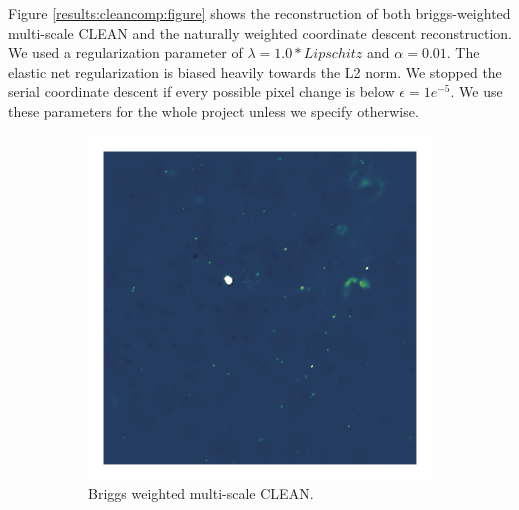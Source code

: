 Figure \ref{results:cleancomp:figure} shows the reconstruction of both briggs-weighted multi-scale CLEAN and the naturally weighted coordinate descent reconstruction. We used a regularization parameter of $\lambda = 1.0 * Lipschitz$ and $\alpha = 0.01$. The elastic net regularization is biased heavily towards the L2 norm. We stopped the serial coordinate descent if every possible pixel change is below $\epsilon = 1e^{-5}$. We use these parameters for the whole project unless we specify otherwise.

\newpage

\begin{figure}[h]
	\centering
	\begin{subfigure}[b]{0.49\linewidth}
		\includegraphics[width=1.00\linewidth, clip, trim={0.72in 0.72in 0.72in 0.72in}]{./chapters/10.results/MSClean/Briggs-CLEAN.png}
		\caption{Briggs weighted multi-scale CLEAN.}
		\label{results:comp:clean}
	\end{subfigure}
	\begin{subfigure}[b]{0.49\linewidth}

\end{subfigure}
\end{figure}
